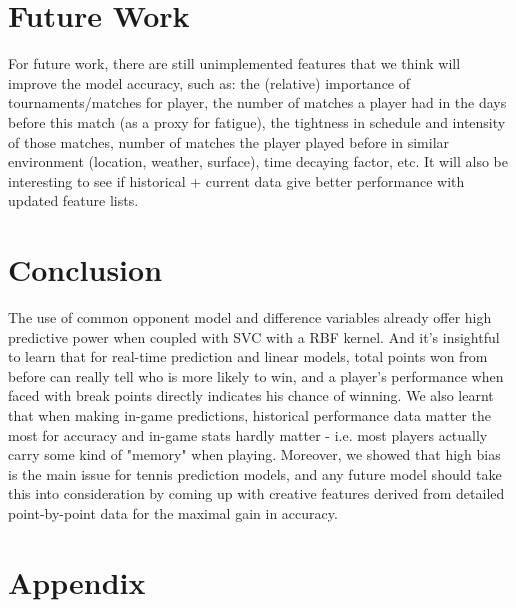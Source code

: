\documentclass[paper=a4, fontsize=10pt]{scrartcl} %
\numberwithin{equation}{section} %
\numberwithin{figure}{section} %
\numberwithin{table}{section} %
\begin{document}
\section{Future Work}
For future work, there are still unimplemented features that we think will improve the model accuracy, such as: the (relative) importance of tournaments/matches for player, the number of matches a player had in the days before this match (as a proxy for fatigue), the tightness in schedule and intensity of those matches, number of matches the player played before in similar environment (location, weather, surface), time decaying factor, etc. It will also be interesting to see if historical + current data give better performance with updated feature lists.
\section{Conclusion}
The use of common opponent model and difference variables already offer high predictive power when coupled with SVC with a RBF kernel. And it's insightful to learn that for real-time prediction and linear models, total points won from before can really tell who is more likely to win, and a player's performance when faced with break points directly indicates his chance of winning. We also learnt that when making in-game predictions, historical performance data matter the most for accuracy and in-game stats hardly matter - i.e. most players actually carry some kind of "memory" when playing.  Moreover, we showed that high bias is the main issue for tennis prediction models, and any future model should take this into consideration by coming up with creative features derived from detailed point-by-point data for the maximal gain in accuracy. 
\section{Appendix}
\end{document}
